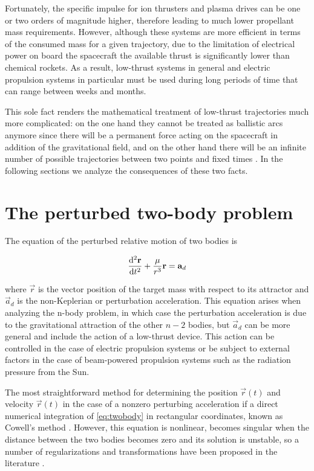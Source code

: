 Fortunately, the specific impulse for ion thrusters and plasma drives can be one or two orders of magnitude higher, therefore leading to much lower propellant mass requirements. However, although these systems are more efficient in terms of the consumed mass for a given trajectory, due to the limitation of electrical power on board the spacecraft the available thrust is significantly lower than chemical rockets. As a result, low-thrust systems in general and electric propulsion systems in particular must be used during long periods of time that can range between weeks and months.

This sole fact renders the mathematical treatment of low-thrust trajectories much more complicated: on the one hand they cannot be treated as ballistic arcs anymore since there will be a permanent force acting on the spacecraft in addition of the gravitational field, and on the other hand there will be an infinite number of possible trajectories between two points and fixed times \cite{woodcock2002benefits}. In the following sections we analyze the consequences of these two facts.

\section{The perturbed two-body problem}

The equation of the perturbed relative motion of two bodies is \cite{battin1999introduction}

\begin{equation}
\deriv[2]{\vec{r}}{t} + \frac{\mu}{r^3} \vec{r} = \vec{a}_d
\label{eq:twobody}
\end{equation}


where $\vec{r}$ is the vector position of the target mass with respect to its attractor and $\vec{a}_d$ is the non-Keplerian or perturbation acceleration. This equation arises when analyzing the n-body problem, in which case the perturbation acceleration is due to the gravitational attraction of the other $n - 2$ bodies, but $\vec{a}_d$ can be more general and include the action of a low-thrust device. This action can be controlled in the case of electric propulsion systems or be subject to external factors in the case of beam-powered propulsion systems such as the radiation pressure from the Sun.

The most straightforward method for determining the position $\vec{r}(t)$ and velocity $\vec{r}(t)$ in the case of a nonzero perturbing acceleration if a direct numerical integration of \ref{eq:twobody} in rectangular coordinates, known as Cowell's method \cite{battin1999introduction}. However, this equation is nonlinear, becomes singular when the distance between the two bodies becomes zero and its solution is unstable, so a number of regularizations and transformations have been proposed in the literature \cite{bau2013new}.

